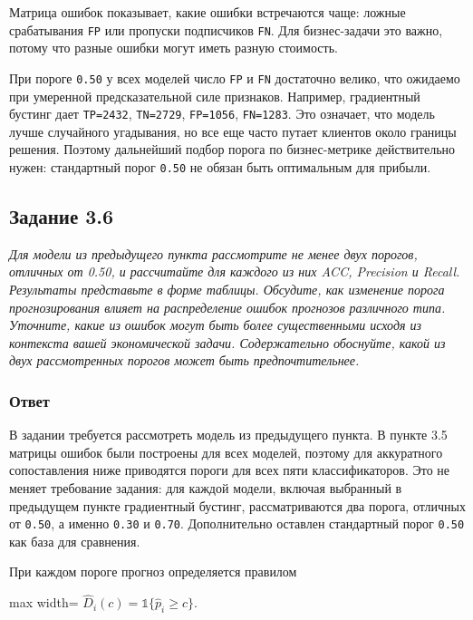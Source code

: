 \documentclass[11pt]{article}
\newenvironment{tasktext}
      {\begin{tcolorbox}[breakable, colback=black!3, colframe=black!28,
        boxrule=0.4pt, arc=1.5mm, left=7pt, right=7pt, top=5pt, bottom=5pt,
        before skip=0.35em, after skip=0.75em]\itshape}
      {\end{tcolorbox}}
\begin{document}
    Матрица ошибок показывает, какие ошибки встречаются чаще: ложные
срабатывания \texttt{FP} или пропуски подписчиков \texttt{FN}. Для
бизнес-задачи это важно, потому что разные ошибки могут иметь разную
стоимость.

При пороге \texttt{0.50} у всех моделей число \texttt{FP} и \texttt{FN}
достаточно велико, что ожидаемо при умеренной предсказательной силе
признаков. Например, градиентный бустинг дает \texttt{TP=2432},
\texttt{TN=2729}, \texttt{FP=1056}, \texttt{FN=1283}. Это означает, что
модель лучше случайного угадывания, но все еще часто путает клиентов
около границы решения. Поэтому дальнейший подбор порога по
бизнес-метрике действительно нужен: стандартный порог \texttt{0.50} не
обязан быть оптимальным для прибыли.

    \subsection{Задание 3.6}\label{ux437ux430ux434ux430ux43dux438ux435-3.6}

\begin{tasktext}
Для модели из предыдущего пункта рассмотрите не менее двух порогов,
отличных от 0.50, и рассчитайте для каждого из них ACC, Precision и
Recall. Результаты представьте в форме таблицы. Обсудите, как изменение
порога прогнозирования влияет на распределение ошибок прогнозов
различного типа. Уточните, какие из ошибок могут быть более
существенными исходя из контекста вашей экономической задачи.
Содержательно обоснуйте, какой из двух рассмотренных порогов может быть
предпочтительнее.
\end{tasktext}

\subsubsection{Ответ}

В задании требуется рассмотреть модель из предыдущего пункта. В пункте
3.5 матрицы ошибок были построены для всех моделей, поэтому для
аккуратного сопоставления ниже приводятся пороги для всех пяти
классификаторов. Это не меняет требование задания: для каждой модели,
включая выбранный в предыдущем пункте градиентный бустинг,
рассматриваются два порога, отличных от \texttt{0.50}, а именно
\texttt{0.30} и \texttt{0.70}. Дополнительно оставлен стандартный порог
\texttt{0.50} как база для сравнения.

При каждом пороге прогноз определяется правилом

\begin{center}
\begin{adjustbox}{max width=\linewidth}
\(\displaystyle \hat D_i(c) = \mathbb{1}\{\hat p_i \ge c\}.\)
\end{adjustbox}
\end{center}
\end{document}
